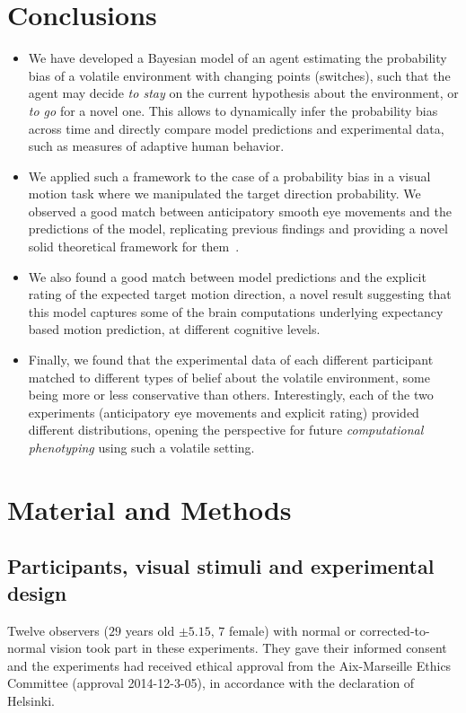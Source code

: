 \documentclass[10pt,letterpaper]{article}
\newcommand{\citep}[1]{\cite{#1}}
\begin{document}
\section{Conclusions}
\begin{itemize}\setlength{\itemsep}{0ex}
\item We have developed a Bayesian model of an agent estimating the probability bias of a volatile environment with changing points (switches), such that the agent may decide \textit{to stay} on the current hypothesis about the environment, or \textit{to go} for a novel one. This allows to dynamically infer the probability bias across time and directly compare model predictions and experimental data, such as measures of adaptive human behavior.
\item We applied such a framework to the case of a probability bias in a visual motion task where we manipulated the target direction probability. We observed a good match between anticipatory smooth eye movements and the predictions of the model, replicating previous findings and providing a novel solid theoretical framework for them~\citep{Montagnini2010, SantosKowler2017, Damasse18}.
\item We also found a good match between model predictions and the explicit rating of the expected target motion direction, a novel result suggesting that this model captures some of the brain computations underlying expectancy based motion prediction, at different cognitive levels.
\item Finally, we found that the experimental data of each different participant matched to different types of belief about the volatile environment, some being more or less conservative than others. Interestingly, each of the two experiments (anticipatory eye movements and explicit rating) provided different distributions, opening the perspective for future \emph{computational phenotyping} using such a volatile setting.
\end{itemize}
\section{Material and Methods}
\label{sec:methods}
\subsection{Participants, visual stimuli and experimental design}
Twelve observers ($29$ years old $\pm 5.15$, $7$ female) with normal or corrected-to-normal vision took part in these experiments. They gave their informed consent and the experiments had received ethical approval from the Aix-Marseille Ethics Committee (approval 2014-12-3-05), in accordance with the declaration of Helsinki.
\end{document}
